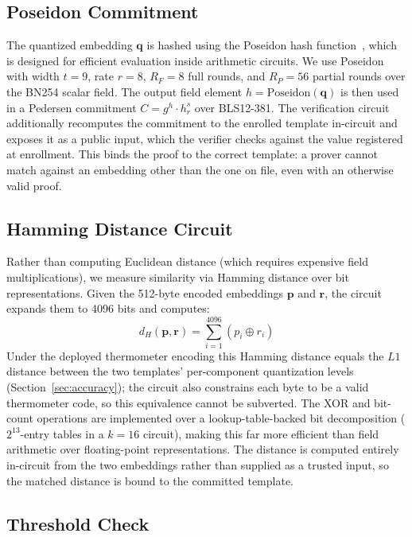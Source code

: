 \documentclass[conference]{IEEEtran}
\begin{document}
\subsection{Poseidon Commitment}

The quantized embedding $\mathbf{q}$ is hashed using the Poseidon hash function~\cite{grassi2021}, which is designed for efficient evaluation inside arithmetic circuits. We use Poseidon with width $t = 9$, rate $r = 8$, $R_F = 8$ full rounds, and $R_P = 56$ partial rounds over the BN254 scalar field. The output field element $h = \text{Poseidon}(\mathbf{q})$ is then used in a Pedersen commitment $C = g^h \cdot h_r^s$ over BLS12-381. The verification circuit additionally recomputes the commitment to the enrolled template in-circuit and exposes it as a public input, which the verifier checks against the value registered at enrollment. This binds the proof to the correct template: a prover cannot match against an embedding other than the one on file, even with an otherwise valid proof.

\subsection{Hamming Distance Circuit}

Rather than computing Euclidean distance (which requires expensive field multiplications), we measure similarity via Hamming distance over bit representations. Given the 512-byte encoded embeddings $\mathbf{p}$ and $\mathbf{r}$, the circuit expands them to 4096 bits and computes:
\begin{equation}
d_H(\mathbf{p}, \mathbf{r}) = \sum_{i=1}^{4096} (p_i \oplus r_i)
\end{equation}
Under the deployed thermometer encoding this Hamming distance equals the $L1$ distance between the two templates' per-component quantization levels (Section~\ref{sec:accuracy}); the circuit also constrains each byte to be a valid thermometer code, so this equivalence cannot be subverted.
The XOR and bit-count operations are implemented over a lookup-table-backed bit decomposition ($2^{13}$-entry tables in a $k=16$ circuit), making this far more efficient than field arithmetic over floating-point representations. The distance is computed entirely in-circuit from the two embeddings rather than supplied as a trusted input, so the matched distance is bound to the committed template.

\subsection{Threshold Check}
\end{document}
